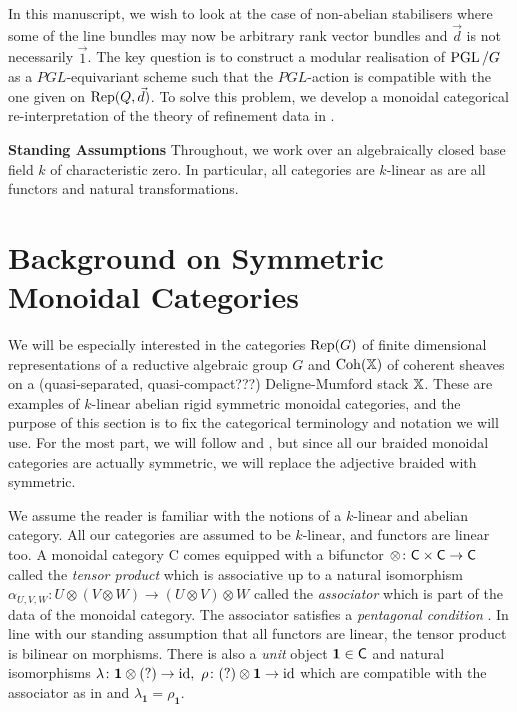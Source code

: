 \documentclass[12pt]{amsart}
\begin{document}
In this manuscript, we wish to look at the case of non-abelian stabilisers where some of the line bundles may now be arbitrary rank vector bundles and $\vec{d}$ is not necessarily $\vec{1}$. The key question is to construct a modular realisation of $\operatorname{PGL}/G$ as a $PGL$-equivariant scheme such that the $PGL$-action is compatible with the one given on $\operatorname{Rep}(Q,\vec{d})$. To solve this problem, we develop a monoidal categorical re-interpretation of the theory of refinement data in \cite{Abd}. 

\textbf{Standing Assumptions} Throughout, we work over an algebraically closed base field $k$ of characteristic zero. In particular, all categories are $k$-linear as are all functors and natural transformations.

\section{Background on Symmetric Monoidal Categories}  \label{sec:Monoidal}

We will be especially interested in the categories $\operatorname{Rep}(G)$ of finite dimensional representations of a reductive algebraic group $G$ and $\operatorname{Coh}(\mathbb{X})$ of coherent sheaves on a (quasi-separated, quasi-compact???) Deligne-Mumford stack $\mathbb{X}$. These are examples of $k$-linear abelian rigid symmetric monoidal categories, and the purpose of this section is to fix the categorical terminology and notation we will use. For the most part, we will follow \cite{EGNO} and \cite{MacL}, but since all our braided monoidal categories are actually symmetric, we will replace the adjective braided with symmetric. 

We assume the reader is familiar with the notions of a $k$-linear and abelian category. All our categories are assumed to be $k$-linear, and functors are linear too. A monoidal category {\sf C} comes equipped with a bifunctor $\otimes \colon {\sf C} \times {\sf C} \to {\sf C}$ called the {\em tensor product} which is associative up to a natural isomorphism $\alpha_{U,V,W} \colon U \otimes (V \otimes W) \to (U \otimes V) \otimes W$ called the {\em associator} which is part of the data of the monoidal category. The associator satisfies a {\em pentagonal condition} \cite[VII]{MacL}. In line with our standing assumption that all functors are linear, the tensor product is bilinear on morphisms. There is also a {\em unit} object $\mathbf{1} \in {\sf C}$ and natural isomorphisms $\lambda \colon \mathbf{1} \otimes(?) \to \id, \ \rho \colon (?) \otimes \mathbf{1} \to \id$ which are compatible with the associator as in \cite[VII.1.(7)]{MacL} and $\lambda_{\mathbf{1}} = \rho_{\mathbf{1}}$. 
\end{document}
